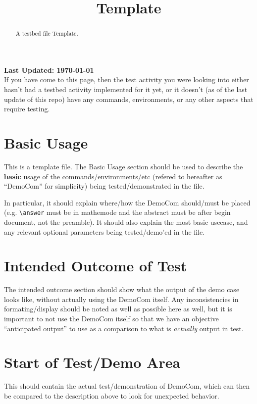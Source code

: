 \documentclass{ximera}
\title{Template}
\begin{document}
\begin{abstract}
    A testbed file Template.
\end{abstract}
\maketitle

{{\Huge \bfseries Last Updated: \today}} \\

If you have come to this page, then the test activity you were looking into either hasn't had a testbed activity implemented for it yet, 
or it doesn't (as of the last update of this repo) have any commands, environments, or any other aspects that require testing.

\section{Basic Usage}

This is a template file. The Basic Usage section should be used to describe the \textbf{basic} usage 
of the commands/environments/etc (refered to hereafter as ``DemoCom'' for simplicity) being tested/demonstrated in the file. 

In particular, it should explain where/how the DemoCom should/must be placed (e.g. \verb|\answer| must be in mathemode 
and the abstract must be after begin document, not the preamble). It should also explain the most basic usecase, and any 
relevant optional parameters being tested/demo'ed in the file.

\section{Intended Outcome of Test}

The intended outcome section should show what the output of the demo case looks like, without actually using the DemoCom itself.
Any inconsistencies in formating/display should be noted as well as possible here as well, but it is important to not use the 
DemoCom itself so that we have an objective ``anticipated output'' to use as a comparison to what is \textit{actually} output in
test. 

\section{Start of Test/Demo Area}

This should contain the actual test/demonstration of DemoCom, which can then be compared to the description above to look for 
unexpected behavior.

\hrulefill
\end{document}
